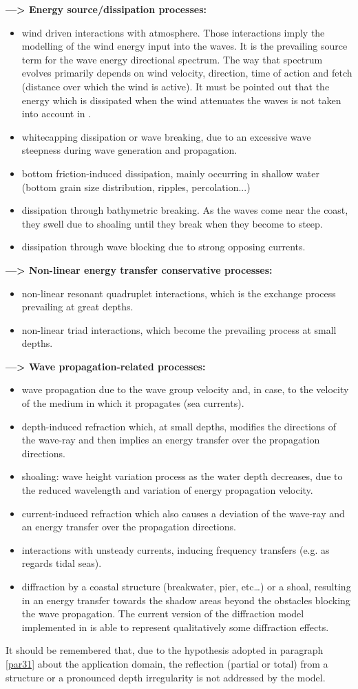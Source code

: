 {\bf—> Energy source/dissipation processes:}
\begin{itemize}
\item wind driven interactions with atmosphere. Those interactions imply the modelling of the wind energy input into the waves. It is the prevailing source term for the wave energy directional spectrum. The way that spectrum evolves primarily depends on wind velocity, direction, time of action and fetch (distance over which the wind is active). It must be pointed out that the energy which is dissipated when the wind attenuates the waves is not taken into account in \tomawac.
\item 	whitecapping dissipation or wave breaking, due to an excessive wave steepness during wave generation and propagation.
\item 	bottom friction-induced dissipation, mainly occurring in shallow water (bottom grain size distribution, ripples, percolation...)
\item 	dissipation through bathymetric breaking. As the waves come near the coast, they swell due to shoaling until they break when they become to steep.
\item dissipation through wave blocking due to strong opposing currents.
\end{itemize}
{\bf—> Non-linear energy transfer conservative processes:}
\begin{itemize}
\item 	non-linear resonant quadruplet interactions, which is the exchange process prevailing at great depths.
\item 		non-linear triad interactions, which become the prevailing process at small depths.
\end{itemize}
{\bf—> Wave propagation-related processes:}
\begin{itemize}
\item 	 wave propagation due to the wave group velocity and, in case, to the velocity of the medium in which it propagates (sea currents).
\item 	depth-induced refraction which, at small depths, modifies the directions of the wave-ray and then implies an energy transfer over the propagation directions.
\item 	shoaling: wave height variation process as the water depth decreases, due to the reduced wavelength and variation of energy propagation velocity.
\item 	current-induced refraction which also causes a deviation of the wave-ray and an energy transfer over the propagation directions.
\item 	interactions with unsteady currents, inducing frequency transfers (e.g. as regards tidal seas).
\item 	diffraction by a coastal structure (breakwater, pier, etc…) or a shoal, resulting in an energy transfer towards the shadow areas beyond the obstacles blocking the wave propagation. The current version of the diffraction model implemented in \tomawac is able to represent qualitatively some diffraction effects.
\end{itemize}

It should be remembered that, due to the hypothesis adopted in paragraph \ref{par31} about the \tomawac application domain, the reflection (partial or total) from a structure or a pronounced depth irregularity is not addressed by the model.

